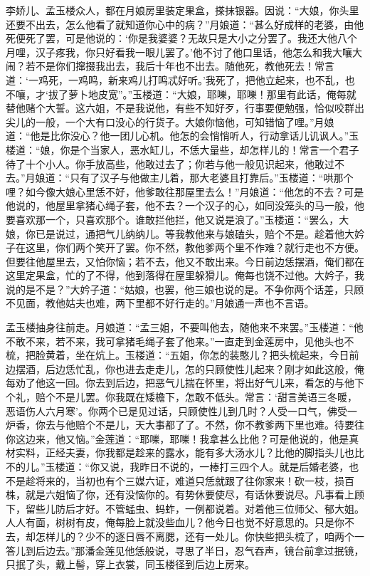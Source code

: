 李娇儿、孟玉楼众人，都在月娘房里装定果盒，搽抹银器。因说：“大娘，你头里还要不出去，怎么他看了就知道你心中的病？”月娘道：“甚么好成样的老婆，由他死便死了罢，可是他说的：‘你是我婆婆？无故只是大小之分罢了。我还大他八个月哩，汉子疼我，你只好看我一眼儿罢了。’他不讨了他口里话，他怎么和我大嚷大闹？若不是你们撺掇我出去，我后十年也不出去。随他死，教他死去！常言道：‘一鸡死，一鸡鸣，新来鸡儿打鸣忒好听。’我死了，把他立起来，也不乱，也不嚷，才‘拔了萝卜地皮宽”。”玉楼道：“大娘，耶嚛，耶嚛！那里有此话，俺每就替他赌个大誓。这六姐，不是我说他，有些不知好歹，行事要便勉强，恰似咬群出尖儿的一般，一个大有口没心的行货子。大娘你恼他，可知错恼了哩。”月娘道：“他是比你没心？他一团儿心机。他怎的会悄悄听人，行动拿话儿讥讽人。”玉楼道：“娘，你是个当家人，恶水缸儿，不恁大量些，却怎样儿的！常言一个君子待了十个小人。你手放高些，他敢过去了；你若与他一般见识起来，他敢过不去。”月娘道：“只有了汉子与他做主儿着，那大老婆且打靠后。”玉楼道：“哄那个哩？如今像大娘心里恁不好，他爹敢往那屋里去么！”月娘道：“他怎的不去？可是他说的，他屋里拿猪心绳子套，他不去？一个汉子的心，如同没笼头的马一般，他要喜欢那一个，只喜欢那个。谁敢拦他拦，他又说是浪了。”玉楼道：“罢么，大娘，你已是说过，通把气儿纳纳儿。等我教他来与娘磕头，赔个不是。趁着他大妗子在这里，你们两个笑开了罢。你不然，教他爹两个里不作难？就行走也不方便。但要往他屋里去，又怕你恼；若不去，他又不敢出来。今日前边恁摆酒，俺们都在这里定果盒，忙的了不得，他到落得在屋里躲猾儿。俺每也饶不过他。大妗子，我说的是不是？”大妗子道：“姑娘，也罢，他三娘也说的是。不争你两个话差，只顾不见面，教他姑夫也难，两下里都不好行走的。”月娘通一声也不言语。

孟玉楼抽身往前走。月娘道：“孟三姐，不要叫他去，随他来不来罢。”玉楼道：“他不敢不来，若不来，我可拿猪毛绳子套了他来。”一直走到金莲房中，见他头也不梳，把脸黄着，坐在炕上。玉楼道：“五姐，你怎的装憨儿？把头梳起来，今日前边摆酒，后边恁忙乱，你也进去走走儿，怎的只顾使性儿起来？刚才如此这般，俺每劝了他这一回。你去到后边，把恶气儿揣在怀里，将出好气儿来，看怎的与他下个礼，赔个不是儿罢。你我既在矮檐下，怎敢不低头。常言：‘甜言美语三冬暖，恶语伤人六月寒’。你两个已是见过话，只顾使性儿到几时？人受一口气，佛受一炉香，你去与他赔个不是儿，天大事都了了。不然，你不教爹两下里也难。待要往你这边来，他又恼。”金莲道：“耶嚛，耶嚛！我拿甚么比他？可是他说的，他是真材实料，正经夫妻，你我都是趁来的露水，能有多大汤水儿？比他的脚指头儿也比不的儿。”玉楼道：“你又说，我昨日不说的，一棒打三四个人。就是后婚老婆，也不是趁将来的，当初也有个三媒六证，难道只恁就跟了往你家来！砍一枝，损百株，就是六姐恼了你，还有没恼你的。有势休要使尽，有话休要说尽。凡事看上顾下，留些儿防后才好。不管蜢虫、蚂蚱，一例都说着。对着他三位师父、郁大姐。人人有面，树树有皮，俺每脸上就没些血儿？他今日也觉不好意思的。只是你不去，却怎样儿的？少不的逐日唇不离腮，还有一处儿。你快些把头梳了，咱两个一答儿到后边去。”那潘金莲见他恁般说，寻思了半日，忍气吞声，镜台前拿过抿镜，只抿了头，戴上髻，穿上衣裳，同玉楼径到后边上房来。

